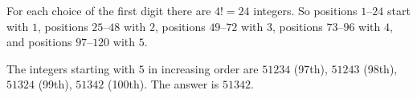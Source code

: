 For each choice of the first digit there are $4!=24$ integers. So positions $1$--$24$ start with $1$, positions $25$--$48$ with $2$, positions $49$--$72$ with $3$, positions $73$--$96$ with $4$, and positions $97$--$120$ with $5$.

The integers starting with $5$ in increasing order are $51234$ (97th), $51243$ (98th), $51324$ (99th), $51342$ (100th). The answer is $\boxed{51342}$.
